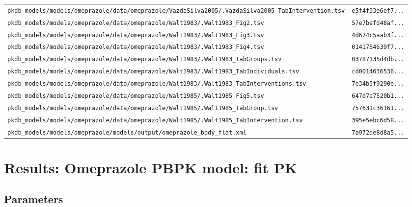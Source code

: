 \documentclass{article}
\begin{document}
\begin{longtable}{ll}
\texttt{pkdb\_models/models/omeprazole/data/omeprazole/VazdaSilva2005/.VazdaSilva2005\_TabIntervention.tsv} & \texttt{e5f4f33e6ef7...} \\
\texttt{pkdb\_models/models/omeprazole/data/omeprazole/Walt1983/.Walt1983\_Fig2.tsv} & \texttt{57e7befd48af...} \\
\texttt{pkdb\_models/models/omeprazole/data/omeprazole/Walt1983/.Walt1983\_Fig3.tsv} & \texttt{4d674c5aab3f...} \\
\texttt{pkdb\_models/models/omeprazole/data/omeprazole/Walt1983/.Walt1983\_Fig4.tsv} & \texttt{0141784639f7...} \\
\texttt{pkdb\_models/models/omeprazole/data/omeprazole/Walt1983/.Walt1983\_TabGroups.tsv} & \texttt{03787135d4db...} \\
\texttt{pkdb\_models/models/omeprazole/data/omeprazole/Walt1983/.Walt1983\_TabIndividuals.tsv} & \texttt{cd0014636536...} \\
\texttt{pkdb\_models/models/omeprazole/data/omeprazole/Walt1983/.Walt1983\_TabInterventions.tsv} & \texttt{7e34b5f9290e...} \\
\texttt{pkdb\_models/models/omeprazole/data/omeprazole/Walt1985/.Walt1985\_Fig5.tsv} & \texttt{647d7e7520b1...} \\
\texttt{pkdb\_models/models/omeprazole/data/omeprazole/Walt1985/.Walt1985\_TabGroup.tsv} & \texttt{757631c36161...} \\
\texttt{pkdb\_models/models/omeprazole/data/omeprazole/Walt1985/.Walt1985\_TabIntervention.tsv} & \texttt{395e5ebc6d58...} \\
\texttt{pkdb\_models/models/omeprazole/models/output/omeprazole\_body\_flat.xml} & \texttt{7a972de8d8a5...} \\
\end{longtable}

\section{Results: Omeprazole PBPK model: fit PK}

\subsection{Parameters}
\end{document}

